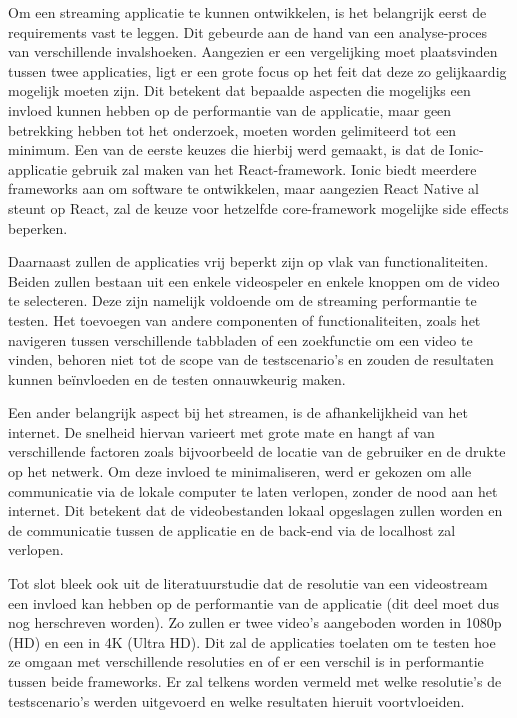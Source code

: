 Om een streaming applicatie te kunnen ontwikkelen, is het belangrijk eerst de requirements vast te leggen. Dit gebeurde aan de hand van een analyse-proces van verschillende invalshoeken. Aangezien er een vergelijking moet plaatsvinden tussen twee applicaties, ligt er een grote focus op het feit dat deze zo gelijkaardig mogelijk moeten zijn. Dit betekent dat bepaalde aspecten die mogelijks een invloed kunnen hebben op de performantie van de applicatie, maar geen betrekking hebben tot het onderzoek, moeten worden gelimiteerd tot een minimum. Een van de eerste keuzes die hierbij werd gemaakt, is dat de Ionic-applicatie gebruik zal maken van het React-framework. Ionic biedt meerdere frameworks aan om software te ontwikkelen, maar aangezien React Native al steunt op React, zal de keuze voor hetzelfde core-framework mogelijke side effects beperken.

Daarnaast zullen de applicaties vrij beperkt zijn op vlak van functionaliteiten. Beiden zullen bestaan uit een enkele videospeler en enkele knoppen om de video te selecteren. Deze zijn namelijk voldoende om de streaming performantie te testen. Het toevoegen van andere componenten of functionaliteiten, zoals het navigeren tussen verschillende tabbladen of een zoekfunctie om een video te vinden, behoren niet tot de scope van de testscenario's en zouden de resultaten kunnen beïnvloeden en de testen onnauwkeurig maken.

Een ander belangrijk aspect bij het streamen, is de afhankelijkheid van het internet. De snelheid hiervan varieert met grote mate en hangt af van verschillende factoren zoals bijvoorbeeld de locatie van de gebruiker en de drukte op het netwerk. Om deze invloed te minimaliseren, werd er gekozen om alle communicatie via de lokale computer te laten verlopen, zonder de nood aan het internet. Dit betekent dat de videobestanden lokaal opgeslagen zullen worden en de communicatie tussen de applicatie en de back-end via de localhost zal verlopen.

Tot slot bleek ook uit de literatuurstudie dat de resolutie van een videostream een invloed kan hebben op de performantie van de applicatie (dit deel moet dus nog herschreven worden). Zo zullen er twee video's aangeboden worden in 1080p (HD) en een in 4K (Ultra HD). Dit zal de applicaties toelaten om te testen hoe ze omgaan met verschillende resoluties en of er een verschil is in performantie tussen beide frameworks. Er zal telkens worden vermeld met welke resolutie's de testscenario's werden uitgevoerd en welke resultaten hieruit voortvloeiden.


